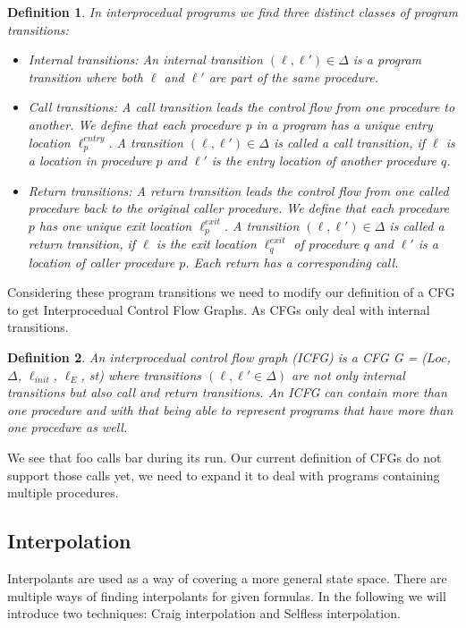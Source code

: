 \documentclass{article}
\newtheorem{mydef}{Definition}
\newcommand\mycom[1]{}
\newcommand\mycom[1]{#1}
\newcommand{\jw}[1]{\mycom{\todo[color=blue!40,inline]{\small JW: #1}}}
\begin{document}
	
	\begin{mydef} In interprocedual programs we find three distinct classes of program transitions:
		\begin{itemize}
			\item Internal transitions: An internal transition $(\ell, \ell') \in \Delta$ is a program transition where both $\ell$ and $\ell'$ are part of the same procedure. 
			
			\item Call transitions:  A call transition leads the control flow from one procedure to another. We define that each procedure p in a program has a unique entry location $\ell^{entry}_p$. A transition $(\ell, \ell') \in \Delta$ is called a call transition, if $\ell$ is a location in procedure $p$ and $\ell'$ is the entry location of another procedure $q$.
			
			\item Return transitions: A return transition leads the control flow from one called procedure back to the original caller procedure. We define that each procedure $p$ has one unique exit location $\ell^{exit}_p$. A transition $(\ell, \ell') \in \Delta$ is called a return transition, if $\ell$ is the exit location $\ell_q^{exit}$ of procedure $q$ and $\ell'$ is a location of caller procedure $p$. Each return has a corresponding call.
		\end{itemize}
	\end{mydef}
\jw{explain the formulas}
	 \bigskip\noindent
	Considering these program transitions we need to modify our definition of a CFG to get Interprocedual Control Flow Graphs. As CFGs only deal with internal transitions.
	\begin{mydef}
		An interprocedual control flow graph (ICFG) is a CFG G = ($Loc$, $\Delta$, $\ell_{init}$, $\ell_E$, st) where transitions $(\ell, \ell' \in \Delta)$ are not only internal transitions but also call and return transitions. An ICFG can contain more than one procedure and with that being able to represent programs that have more than one procedure as well.
	\end{mydef}
	
	\jw{\textbf{@ToDo extend example by procedure call}} 
	We see that foo calls bar during its run. Our current definition of CFGs do not support those calls yet, we need to expand it to deal with programs containing multiple procedures.
	
	
	\pagebreak
		
	\subsection{Interpolation}
	Interpolants are used as a way of covering a more general state space. There are multiple ways of finding interpolants for given formulas.
	In the following we will introduce two techniques: Craig interpolation and Selfless interpolation. 
	\jw{citation needed}
	
\end{document}
